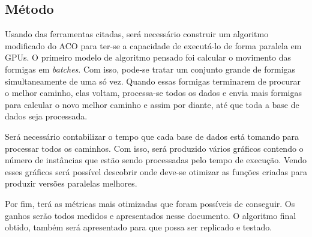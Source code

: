 \subsection{Método} \label{Metodo}

Usando das ferramentas citadas, será necessário construir um algoritmo modificado
do ACO para ter-se a capacidade de executá-lo de forma paralela em GPUs.
O primeiro modelo de algoritmo pensado foi calcular o movimento das formigas em \emph{batches}.
Com isso, pode-se tratar um conjunto grande de formigas simultaneamente de uma só vez. 
Quando essas formigas terminarem de procurar o melhor caminho, elas voltam, processa-se todos os 
dados e envia mais formigas para calcular o novo melhor caminho e assim por diante, até que toda 
a base de dados seja processada.

Será necessário contabilizar o tempo que cada base de dados está tomando para processar todos os 
caminhos. Com isso, será produzido vários gráficos contendo o número de instâncias que estão sendo 
processadas pelo tempo de execução. Vendo esses gráficos será possível descobrir onde deve-se otimizar
as funções criadas para produzir versões paralelas melhores.

Por fim, terá as métricas mais otimizadas que foram possíveis de conseguir. Os ganhos serão todos 
medidos e apresentados nesse documento. O algoritmo final obtido, também será apresentado para que 
possa ser replicado e testado.